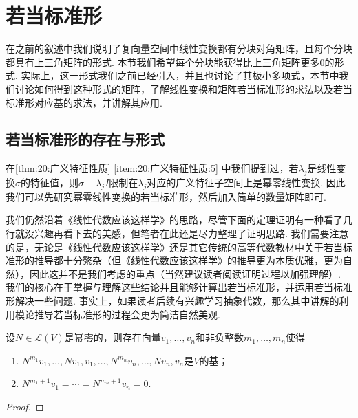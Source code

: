 \chapter{若当标准形}

在之前的叙述中我们说明了复向量空间中线性变换都有分块对角矩阵，且每个分块都具有上三角矩阵的形式. 本节我们希望每个分块能获得比上三角矩阵更多0的形式. 实际上，这一形式我们之前已经引入，并且也讨论了其极小多项式，本节中我们讨论如何得到这种形式的矩阵，了解线性变换和矩阵若当标准形的求法以及若当标准形对应基的求法，并讲解其应用.

\section{若当标准形的存在与形式}

在\autoref{thm:20:广义特征性质} \ref*{item:20:广义特征性质:5} 中我们提到过，若$\lambda_j$是线性变换$\sigma$的特征值，则$\sigma-\lambda_jI$限制在$\lambda_j$对应的广义特征子空间上是幂零线性变换. 因此我们可以先研究幂零线性变换的若当标准形，然后加入简单的数量矩阵即可.

我们仍然沿着《线性代数应该这样学》的思路，尽管下面的定理证明有一种看了几行就没兴趣再看下去的美感，但笔者在此还是尽力整理了证明思路. 我们需要注意的是，无论是《线性代数应该这样学》还是其它传统的高等代数教材中关于若当标准形的推导都十分繁杂（但《线性代数应该这样学》的推导更为本质优雅，更为自然），因此这并不是我们考虑的重点（当然建议读者阅读证明过程以加强理解）. 我们的核心在于掌握与理解这些结论并且能够计算出若当标准形，并运用若当标准形解决一些问题. 事实上，如果读者后续有兴趣学习抽象代数，那么其中讲解的利用模论推导若当标准形的过程会更为简洁自然美观.
\begin{theorem} \label{thm:22:若当基存在}
    设$N\in \mathcal{L}(V)$是幂零的，则存在向量$v_1,\ldots,v_n$和非负整数$m_1,\ldots,m_n$使得
    \begin{enumerate}[label=(\arabic*)]
        \item \label{item:22:若当基存在:1}
              $N^{m_1}v_1,\ldots,Nv_1,v_1,\ldots,N^{m_n}v_n,\ldots,Nv_n,v_n$是$V$的基；

        \item \label{item:22:若当基存在:2}
              $N^{m_1+1}v_1=\cdots=N^{m_n+1}v_n=0$.
    \end{enumerate}
\end{theorem}

\begin{proof}

\end{proof}

